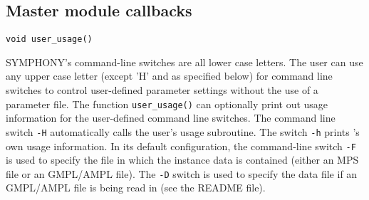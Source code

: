 

\subsection{Master module callbacks}

\bd


\label{user_usage}
\begin{verbatim}
void user_usage()
\end{verbatim}

\bd

\describe

SYMPHONY's command-line switches are all lower case letters. The user can use
any upper case letter (except 'H' and as specified below) for command line
switches to control user-defined parameter settings without the use of a
parameter file. The function {\tt user\_usage()} can optionally print out
usage information for the user-defined command line switches. The command line
switch {\tt -H} automatically calls the user's usage subroutine. The switch
{\tt -h} prints \BB's own usage information. In its default configuration, the
command-line switch \texttt{-F} is used to specify the file in which the
instance data is contained (either an MPS file or an GMPL/AMPL file). The
\texttt{-D} switch is used to specify the data file if an GMPL/AMPL file is
being read in (see the README file).

